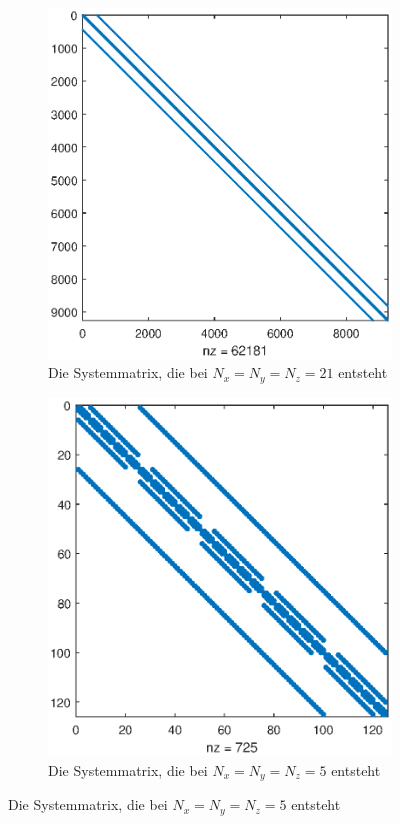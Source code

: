 \begin{figure}[h]
	\vspace*{-38pt}
	\begin{subfigure}{.49\textwidth}
		\centering
		\includegraphics[width=\textwidth]{data/Ag8_2MatrixA}
		\caption{Die Systemmatrix, die bei $N_x = N_y = N_z = 21$ entsteht}
		\label{fig:MatA}
	\end{subfigure}
	\begin{subfigure}{.49\textwidth}
		\centering
		\includegraphics[width=\textwidth]{data/Ag8_2MatrixAkleiner}
		\caption{Die Systemmatrix, die bei $N_x = N_y = N_z = 5$ entsteht}
	\end{subfigure}
\end{figure}
